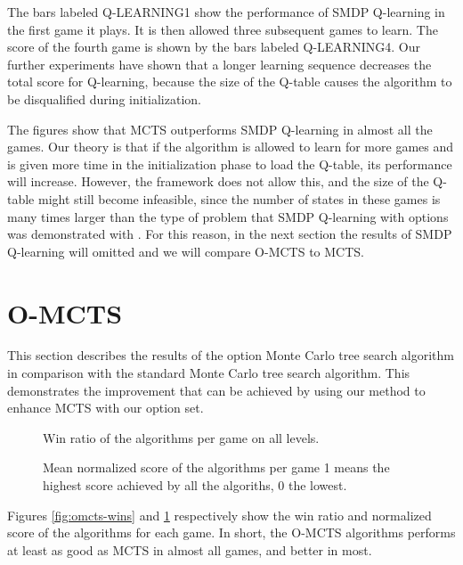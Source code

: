 The bars labeled Q-LEARNING1 show the performance of SMDP Q-learning in
the first game it plays. It is then allowed three subsequent games to learn.
The score of the fourth game is shown by the bars labeled Q-LEARNING4. Our
further experiments have shown that a longer learning sequence decreases the
total score for Q-learning, because the size of the Q-table causes the algorithm
to be disqualified during initialization.

The figures show that MCTS outperforms SMDP Q-learning in almost all the games.
Our theory is that if the algorithm is allowed to learn for more games and is
given more time in the initialization phase to load the Q-table, its performance
will increase. However, the framework does not allow this, and the size of the
Q-table might still become infeasible, since the number of states in these
games is many times larger than the type of problem that SMDP Q-learning with
options was demonstrated with \cite{sutton1999between}. For this reason, in the
next section the results of SMDP Q-learning will omitted and we will compare
O-MCTS to MCTS.

\section{O-MCTS}
This section describes the results of the option Monte Carlo tree search
algorithm in comparison with the standard Monte Carlo tree search algorithm.
This demonstrates the improvement that can be achieved by using our method to
enhance MCTS with our option set.

\label{subsec:omcts}
\begin{figure}
	\centering
	\vspace{-.8cm}
	\caption{Win ratio of the algorithms per game on all levels.}
	\label{fig:omcts-wins}
	\centering
	\vspace{-.8cm}
	\caption{Mean normalized score of the algorithms per game 1 means the
	highest score achieved by all the algoriths, 0 the lowest.}
	\label{fig:omcts-scores}
\end{figure}

Figures \ref{fig:omcts-wins} and \ref{fig:omcts-scores} respectively show the
win ratio and normalized score of the algorithms for each game. In short, the
O-MCTS algorithms performs at least as good as MCTS in almost all games, and
better in most.

